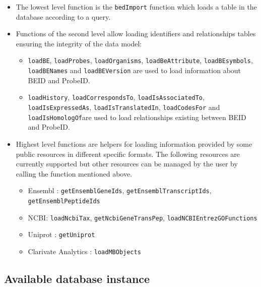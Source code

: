 \documentclass[9pt,a4paper,]{extarticle}
\theoremstyle{definition}
\theoremstyle{definition}
\theoremstyle{definition}
\theoremstyle{remark}
\begin{document}
\begin{itemize}
\item
  The lowest level function is the \texttt{bedImport} function
  which loads a table in the \neo{} database according to a \cypher{} query.
\item
  Functions of the second level allow loading identifiers and relationships
  tables ensuring the integrity of the data model:

  \begin{itemize}
  \item
    \texttt{loadBE}, \texttt{loadProbes}, \texttt{loadOrganisms}, \texttt{loadBeAttribute},
    \texttt{loadBEsymbols}, \texttt{loadBENames} and \texttt{loadBEVersion}
    are used to load information about BEID and ProbeID.
  \item
    \texttt{loadHistory}, \texttt{loadCorrespondsTo}, \texttt{loadIsAssociatedTo},
    \texttt{loadIsExpressedAs}, \texttt{loadIsTranslatedIn}, \texttt{loadCodesFor}
    and \texttt{loadIsHomologOf}are used to load relationships existing
    between BEID and ProbeID.
  \end{itemize}
\item
  Highest level functions are helpers for loading information provided by
  some public resources in different specific formats.
  The following resources are currently supported but other resources can
  be managed by the user by calling the function mentioned above.

  \begin{itemize}
  \item
    Ensembl \citep{zerbino_ensembl_2017}:
    \texttt{getEnsemblGeneIds}, \texttt{getEnsemblTranscriptIds}, \texttt{getEnsemblPeptideIds}
  \item
    NCBI\citep{ncbi_resource_coordinators_database_2017}:
    \texttt{loadNcbiTax}, \texttt{getNcbiGeneTransPep}, \texttt{loadNCBIEntrezGOFunctions}
  \item
    Uniprot \citep{the_uniprot_consortium_uniprot:_2017}: \texttt{getUniprot}
  \item
    Clarivate Analytics \metabase{} \citep{clarivate_analytics_metacore_2017}:
    \texttt{loadMBObjects}
  \end{itemize}
\end{itemize}

\subsection{Available database instance}\label{available-database-instance}
\end{document}
